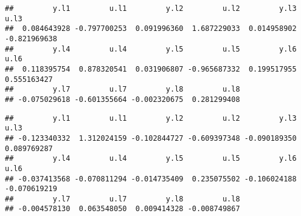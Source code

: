 \documentclass[
]{book}
\newenvironment{Shaded}{\begin{snugshade}}{\end{snugshade}}
\newcommand{\AttributeTok}[1]{\textcolor[rgb]{0.77,0.63,0.00}{#1}}
\newcommand{\DecValTok}[1]{\textcolor[rgb]{0.00,0.00,0.81}{#1}}
\newcommand{\FunctionTok}[1]{\textcolor[rgb]{0.00,0.00,0.00}{#1}}
\newcommand{\NormalTok}[1]{#1}
\newcommand{\OtherTok}[1]{\textcolor[rgb]{0.56,0.35,0.01}{#1}}
\newcommand{\SpecialCharTok}[1]{\textcolor[rgb]{0.00,0.00,0.00}{#1}}
\newcommand{\StringTok}[1]{\textcolor[rgb]{0.31,0.60,0.02}{#1}}
\begin{document}
\begin{Shaded}
\end{Shaded}

\begin{verbatim}
##         y.l1         u.l1         y.l2         u.l2         y.l3         u.l3 
##  0.084643928 -0.797700253  0.091996360  1.687229033  0.014958902 -0.821969638 
##         y.l4         u.l4         y.l5         u.l5         y.l6         u.l6 
##  0.118395754  0.878320541  0.031906807 -0.965687332  0.199517955  0.555163427 
##         y.l7         u.l7         y.l8         u.l8 
## -0.075029618 -0.601355664 -0.002320675  0.281299408
\end{verbatim}

\begin{Shaded}
\end{Shaded}

\begin{verbatim}
##         y.l1         u.l1         y.l2         u.l2         y.l3         u.l3 
## -0.123340332  1.312024159 -0.102844727 -0.609397348 -0.090189350  0.089769287 
##         y.l4         u.l4         y.l5         u.l5         y.l6         u.l6 
## -0.037413568 -0.070811294 -0.014735409  0.235075502 -0.106024188 -0.070619219 
##         y.l7         u.l7         y.l8         u.l8 
## -0.004578130  0.063548050  0.009414328 -0.008749867
\end{verbatim}

\begin{Shaded}
\end{Shaded}
\end{document}
